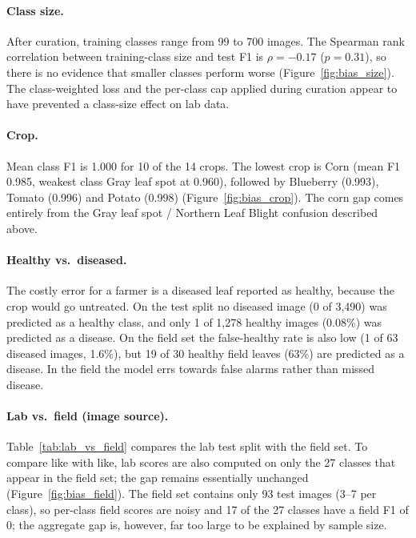 \paragraph{Class size.} After curation, training classes range from 99 to 700 images. The Spearman rank correlation between training-class size and test F1 is $\rho = -0.17$ ($p = 0.31$), so there is no evidence that smaller classes perform worse (Figure~\ref{fig:bias_size}). The class-weighted loss and the per-class cap applied during curation appear to have prevented a class-size effect on lab data.

\paragraph{Crop.} Mean class F1 is 1.000 for 10 of the 14 crops. The lowest crop is Corn (mean F1 0.985, weakest class Gray leaf spot at 0.960), followed by Blueberry (0.993), Tomato (0.996) and Potato (0.998) (Figure~\ref{fig:bias_crop}). The corn gap comes entirely from the Gray leaf spot / Northern Leaf Blight confusion described above.

\paragraph{Healthy vs.\ diseased.} The costly error for a farmer is a diseased leaf reported as healthy, because the crop would go untreated. On the test split no diseased image (0 of 3,490) was predicted as a healthy class, and only 1 of 1,278 healthy images (0.08\%) was predicted as a disease. On the field set the false-healthy rate is also low (1 of 63 diseased images, 1.6\%), but 19 of 30 healthy field leaves (63\%) are predicted as a disease. In the field the model errs towards false alarms rather than missed disease.

\paragraph{Lab vs.\ field (image source).} Table~\ref{tab:lab_vs_field} compares the lab test split with the field set. To compare like with like, lab scores are also computed on only the 27 classes that appear in the field set; the gap remains essentially unchanged (Figure~\ref{fig:bias_field}). The field set contains only 93 test images (3--7 per class), so per-class field scores are noisy and 17 of the 27 classes have a field F1 of 0; the aggregate gap is, however, far too large to be explained by sample size.

